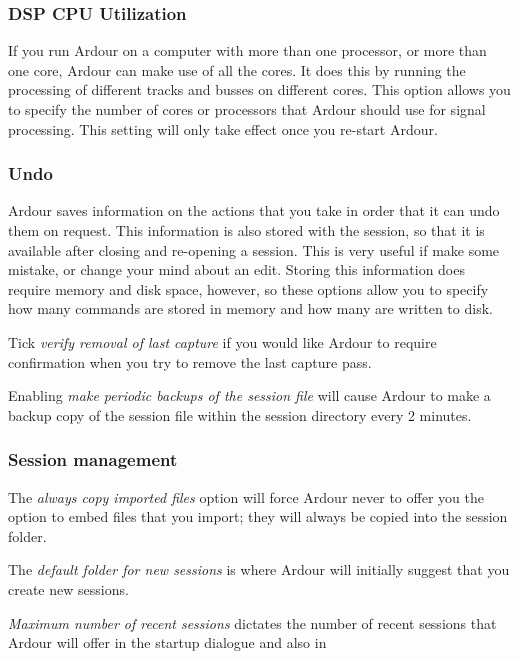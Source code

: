 \documentclass[10pt,a4paper]{book}
\newcommand{\menu}[1]{\emph{\StrSubstitute{#1}{,}{ $\rightarrow$ }}}
\begin{document}
{\subsubsection{DSP CPU Utilization}

If you run Ardour on a computer with more than one processor, or more
than one core, Ardour can make use of all the cores.  It does this by
running the processing of different tracks and busses on different
cores.  This option allows you to specify the number of cores or
processors that Ardour should use for signal processing.  This setting
will only take effect once you re-start Ardour.

\subsubsection{Undo}

Ardour saves information on the actions that you take in order that it
can undo them on request.  This information is also stored with the
session, so that it is available after closing and re-opening a
session.  This is very useful if make some mistake, or change your
mind about an edit.  Storing this information does require memory and
disk space, however, so these options allow you to specify how many
commands are stored in memory and how many are written to disk.

Tick \emph{verify removal of last capture} if you would like Ardour to
require confirmation when you try to remove the last capture pass.

Enabling \emph{make periodic backups of the session file} will cause
Ardour to make a backup copy of the session file within the session
directory every 2 minutes.

\subsubsection{Session management}

The \emph{always copy imported files} option will force Ardour never
to offer you the option to embed files that you import; they will
always be copied into the session folder.

The \emph{default folder for new sessions} is where Ardour will
initially suggest that you create new sessions.

\emph{Maximum number of recent sessions} dictates the number of recent
sessions that Ardour will offer in the startup dialogue and also in
\menu{Session,Recent...}

}
\end{document}
